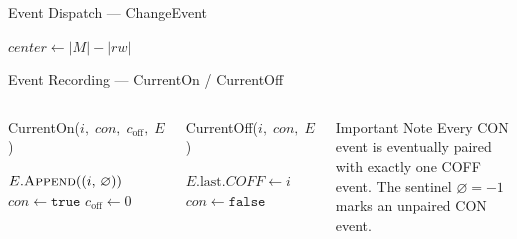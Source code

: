 \documentclass{beamer}
\begin{document}

\begin{frame}{Event Dispatch --- ChangeEvent}
  \begin{algorithmic}[1]
      \State $\mathit{center} \gets |M| - |\mathit{rw}|$
      \hfill{}
        \hfill{}
          \State {}
          \hfill{}
        \EndIf
      \Else
          \State {}
          \hfill{}
        \EndIf
      \EndIf
    \EndFunction
  \end{algorithmic}
\end{frame}

\begin{frame}{Event Recording --- CurrentOn / CurrentOff}
  \begin{columns}[T]
      \begin{block}{CurrentOn($i,\; \mathit{con},\; c_\text{off},\; E$)}
        \begin{algorithmic}[1]
            \State $E.\textsc{Append}((i,\,\varnothing))$
            \State $\mathit{con} \gets \texttt{true}$
            \State $c_\text{off} \gets 0$
          \EndFunction
        \end{algorithmic}
      \end{block}
      \vspace{0.8em}
      \begin{block}{CurrentOff($i,\; \mathit{con},\; E$)}
        \begin{algorithmic}[1]
            \State $E.\text{last}.\mathit{COFF} \gets i$
            \State $\mathit{con} \gets \texttt{false}$
          \EndFunction
        \end{algorithmic}
      \end{block}

        \centering
      \begin{alertblock}{Important Note}
        Every CON event is eventually paired with exactly one COFF event.
        The sentinel $\varnothing = -1$ marks an unpaired CON event.
      \end{alertblock}
  \end{columns}
\end{frame}
\end{document}
